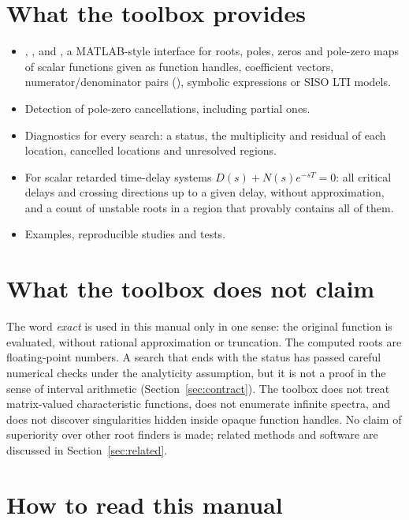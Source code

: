 \section{What the toolbox provides}

\begin{itemize}
  \item {}, ,  and , a
        MATLAB-style interface for roots, poles, zeros and pole-zero maps
        of scalar functions given as function handles, coefficient vectors,
        numerator/denominator pairs (), symbolic expressions or
        SISO LTI models.
  \item Detection of pole-zero cancellations, including partial ones.
  \item Diagnostics for every search: a status, the multiplicity and
        residual of each location, cancelled locations and unresolved
        regions.
  \item For scalar retarded time-delay systems $D(s)+N(s)e^{-sT}=0$: all
        critical delays and crossing directions up to a given delay,
        without approximation, and a count of unstable roots in a region
        that provably contains all of them.
  \item Examples, reproducible studies and tests.
\end{itemize}

\section{What the toolbox does not claim}

The word \emph{exact} is used in this manual only in one sense: the original
function is evaluated, without rational approximation or truncation. The
computed roots are floating-point numbers. A search that ends with the
status  has passed careful numerical checks
under the analyticity assumption, but it is not a proof in the sense of
interval arithmetic (Section~\ref{sec:contract}). The toolbox does not treat
matrix-valued characteristic functions, does not enumerate infinite spectra,
and does not discover singularities hidden inside opaque function handles.
No claim of superiority over other root finders is made; related methods
and software are discussed in Section~\ref{sec:related}.

\section{How to read this manual}


